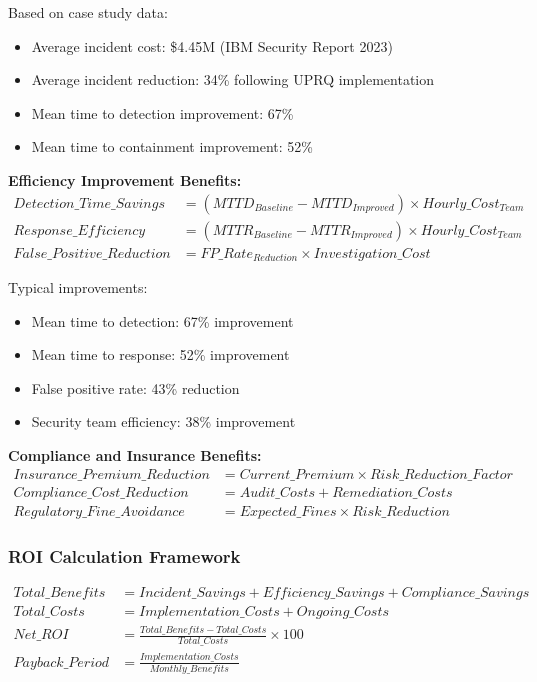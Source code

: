 \documentclass[11pt,a4paper]{article}
\begin{document}
Based on case study data:
\begin{itemize}
\item Average incident cost: \$4.45M (IBM Security Report 2023)
\item Average incident reduction: 34\% following UPRQ implementation
\item Mean time to detection improvement: 67\%
\item Mean time to containment improvement: 52\%
\end{itemize}

\textbf{Efficiency Improvement Benefits:}
\begin{align}
Detection\_Time\_Savings &= (MTTD_{Baseline} - MTTD_{Improved}) \times Hourly\_Cost_{Team} \\
Response\_Efficiency &= (MTTR_{Baseline} - MTTR_{Improved}) \times Hourly\_Cost_{Team} \\
False\_Positive\_Reduction &= FP\_Rate_{Reduction} \times Investigation\_Cost
\end{align}

Typical improvements:
\begin{itemize}
\item Mean time to detection: 67\% improvement
\item Mean time to response: 52\% improvement
\item False positive rate: 43\% reduction
\item Security team efficiency: 38\% improvement
\end{itemize}

\textbf{Compliance and Insurance Benefits:}
\begin{align}
Insurance\_Premium\_Reduction &= Current\_Premium \times Risk\_Reduction\_Factor \\
Compliance\_Cost\_Reduction &= Audit\_Costs + Remediation\_Costs \\
Regulatory\_Fine\_Avoidance &= Expected\_Fines \times Risk\_Reduction
\end{align}

\subsubsection{ROI Calculation Framework}

\begin{align}
Total\_Benefits &= Incident\_Savings + Efficiency\_Savings + Compliance\_Savings \\
Total\_Costs &= Implementation\_Costs + Ongoing\_Costs \\
Net\_ROI &= \frac{Total\_Benefits - Total\_Costs}{Total\_Costs} \times 100 \\
Payback\_Period &= \frac{Implementation\_Costs}{Monthly\_Benefits}
\end{align}
\end{document}

